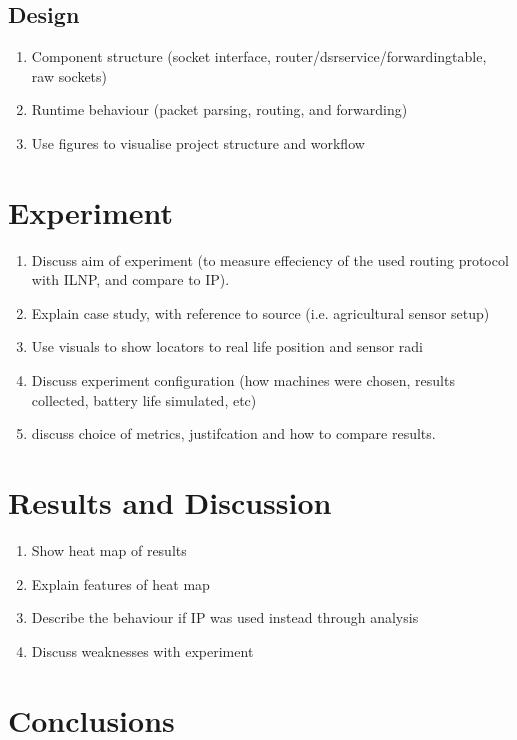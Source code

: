 \documentclass[12pt]{article}
\begin{document}
\subsection{Design}

\begin{enumerate}
\item Component structure (socket interface, router/dsrservice/forwardingtable, raw sockets)
\item Runtime behaviour (packet parsing, routing, and forwarding)
\item Use figures to visualise project structure and workflow
\end{enumerate}

\section{Experiment}

\begin{enumerate}
\item Discuss aim of experiment (to measure effeciency of the used routing protocol with ILNP, and compare to IP).
\item Explain case study, with reference to source (i.e. agricultural sensor setup)
\item Use visuals to show locators to real life position and sensor radi
\item Discuss experiment configuration (how machines were chosen, results collected, battery life simulated, etc)
\item discuss choice of metrics, justifcation and how to compare results.
\end{enumerate}

\section{Results and Discussion}

\begin{enumerate}
\item Show heat map of results
\item Explain features of heat map
\item Describe the behaviour if IP was used instead through analysis
\item Discuss weaknesses with experiment
\end{enumerate}

\section{Conclusions}
\end{document}

